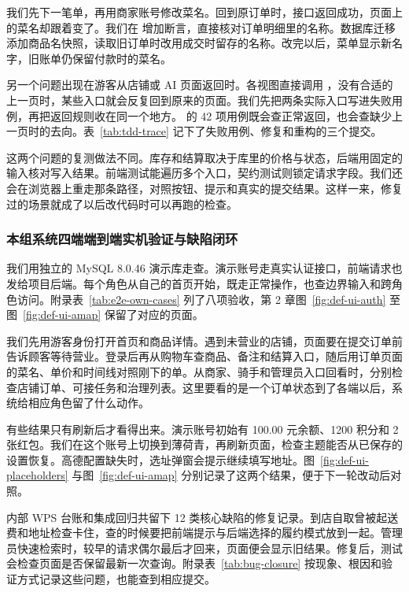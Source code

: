 我们先下一笔单，再用商家账号修改菜名。回到原订单时，接口返回成功，页面上的菜名却跟着变了。我们在 \mbox{} 增加断言，直接核对订单明细里的名称。数据库迁移 \mbox{} 添加商品名快照，读取旧订单时改用成交时留存的名称。改完以后，菜单显示新名字，旧账单仍保留付款时的菜名。

另一个问题出现在游客从店铺或 AI 页面返回时。各视图直接调用 ，没有合适的上一页时，某些入口就会反复回到原来的页面。我们先把两条实际入口写进失败用例，再把返回规则收在同一个地方。 的 42 项用例既会查正常返回，也会查缺少上一页时的去向。表~\ref{tab:tdd-trace} 记下了失败用例、修复和重构的三个提交。

这两个问题的复测做法不同。库存和结算取决于库里的价格与状态，后端用固定的输入核对写入结果。前端测试能遍历多个入口，契约测试则锁定请求字段。我们还会在浏览器上重走那条路径，对照按钮、提示和真实的提交结果。这样一来，修复过的场景就成了以后改代码时可以再跑的检查。

\subsubsection{本组系统四端端到端实机验证与缺陷闭环}

我们用独立的 MySQL 8.0.46 演示库走查。演示账号走真实认证接口，前端请求也发给项目后端。每个角色从自己的首页开始，既走正常操作，也查边界输入和跨角色访问。附录表~\ref{tab:e2e-own-cases} 列了八项验收，第 2 章图~\ref{fig:def-ui-auth} 至图~\ref{fig:def-ui-amap} 保留了对应的页面。

我们先用游客身份打开首页和商品详情。遇到未营业的店铺，页面要在提交订单前告诉顾客等待营业。登录后再从购物车查商品、备注和结算入口，随后用订单页面的菜名、单价和时间线对照刚下的单。从商家、骑手和管理员入口回看时，分别检查店铺订单、可接任务和治理列表。这里要看的是一个订单状态到了各端以后，系统给相应角色留了什么动作。

有些结果只有刷新后才看得出来。演示账号初始有 100.00 元余额、1200 积分和 2 张红包。我们在这个账号上切换到薄荷青，再刷新页面，检查主题能否从已保存的设置恢复。高德配置缺失时，选址弹窗会提示继续填写地址。图~\ref{fig:def-ui-placeholders} 与图~\ref{fig:def-ui-amap} 分别记录了这两个结果，便于下一轮改动后对照。

内部 WPS 台账和集成回归共留下 12 类核心缺陷的修复记录。到店自取曾被起送费和地址检查卡住，查的时候要把前端提示与后端选择的履约模式放到一起。管理员快速检索时，较早的请求偶尔最后才回来，页面便会显示旧结果。修复后，测试会检查页面是否保留最新一次查询。附录表~\ref{tab:bug-closure} 按现象、根因和验证方式记录这些问题，也能查到相应提交。

